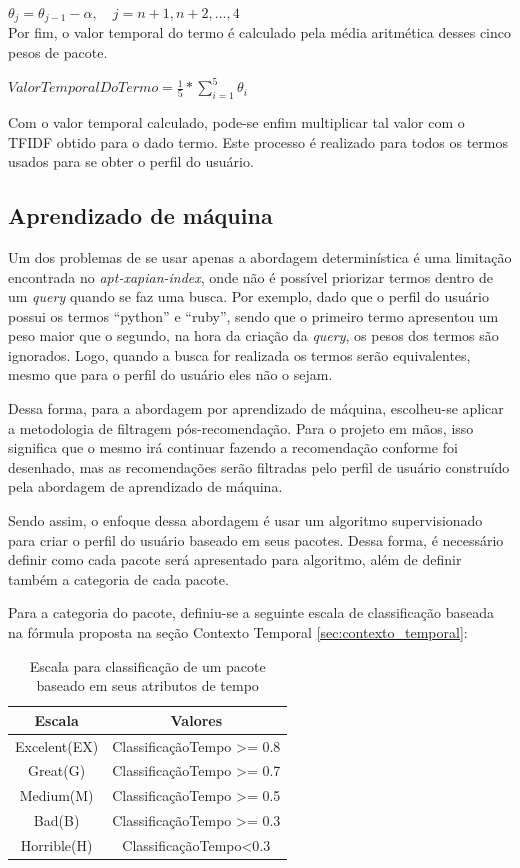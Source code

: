 $\theta_j = \theta_{j-1} - \alpha , \quad j = n+1, n+2, ..., 4$
\\

Por fim, o valor temporal do termo é calculado pela média aritmética desses
cinco pesos de pacote.

$ValorTemporalDoTermo = \frac{1}{5} * \sum\limits_{i=1}^{5} \theta_i$

Com o valor temporal calculado, pode-se enfim multiplicar tal valor com o TFIDF
obtido para o dado termo. Este processo é realizado para todos os termos usados
para se obter o perfil do usuário.

\subsection{Aprendizado de máquina}

Um dos problemas de se usar apenas a abordagem determinística é uma limitação
encontrada no \textit{apt-xapian-index}, onde não é possível priorizar termos
dentro de um \textit{query} quando se faz uma busca. Por exemplo, dado que o perfil
do usuário possui os termos ``python'' e ``ruby'', sendo que o primeiro termo
apresentou um peso maior que o segundo, na hora da criação da \textit{query}, os pesos
dos termos são ignorados. Logo, quando a busca for realizada os termos serão
equivalentes, mesmo que para o perfil do usuário eles não o sejam.

Dessa forma, para a abordagem por aprendizado de máquina, escolheu-se aplicar a
metodologia de filtragem pós-recomendação. Para o projeto em mãos, isso
significa que o mesmo irá continuar fazendo a recomendação conforme foi
desenhado, mas as recomendações serão filtradas pelo perfil de usuário
construído pela abordagem de aprendizado de máquina.

Sendo assim, o enfoque dessa abordagem é usar um algoritmo supervisionado
para criar o perfil do usuário baseado em seus pacotes. Dessa forma, é
necessário definir como cada pacote será apresentado para algoritmo, além de
definir também a categoria de cada pacote.

Para a categoria do pacote, definiu-se a seguinte escala de classificação baseada na
fórmula proposta na seção Contexto Temporal \ref{sec:contexto_temporal}:

\begin{table}[h]
\centering
\begin{tabular}{cc}
\hline
\rowcolor[HTML]{EFEFEF}
{Escala} & {Valores} \\ \hline
{Excelent(EX)}  & ClassificaçãoTempo >= 0.8                  \\ \hline
{Great(G)}   & ClassificaçãoTempo >= 0.7                  \\ \hline
{Medium(M)}   & ClassificaçãoTempo >= 0.5                  \\ \hline
{Bad(B)}   & ClassificaçãoTempo >= 0.3                  \\ \hline
{Horrible(H)}   &ClassificaçãoTempo<0.3                   \\ \hline
\end{tabular}
\caption{Escala para classificação de um pacote baseado em seus atributos de tempo}
\label{tab:classificacao_pacotes}
\end{table}


